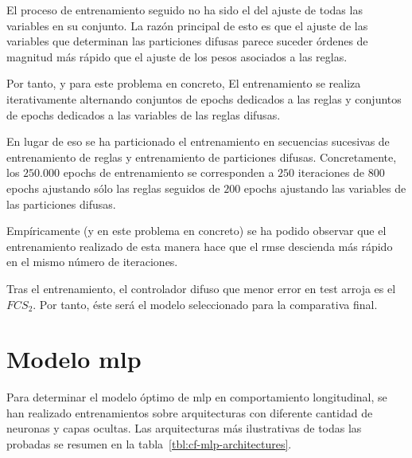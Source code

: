 El proceso de entrenamiento seguido no ha sido el del ajuste de todas las variables en su conjunto. La razón principal de esto es que el ajuste de las variables que determinan las particiones difusas parece suceder órdenes de magnitud más rápido que el ajuste de los pesos asociados a las reglas.

Por tanto, y para este problema en concreto, El entrenamiento se realiza iterativamente alternando conjuntos de epochs dedicados a las reglas y conjuntos de epochs dedicados a las variables de las reglas difusas.

En lugar de eso se ha particionado el entrenamiento en secuencias sucesivas de entrenamiento de reglas y entrenamiento de particiones difusas. Concretamente, los $250.000$ epochs de entrenamiento se corresponden a $250$ iteraciones de $800$ epochs ajustando sólo las reglas seguidos de $200$ epochs ajustando las variables de las particiones difusas.

Empíricamente (y en este problema en concreto) se ha podido observar que el entrenamiento realizado de esta manera hace que el \ac{rmse} descienda más rápido en el mismo número de iteraciones.

Tras el entrenamiento, el controlador difuso que menor error en test arroja es el $FCS_2$. Por tanto, éste será el modelo seleccionado para la comparativa final.


\section{Modelo \ac{mlp}}

Para determinar el modelo óptimo de \ac{mlp} en comportamiento longitudinal, se han realizado entrenamientos sobre arquitecturas con diferente cantidad de neuronas y capas ocultas. Las arquitecturas más ilustrativas de todas las probadas se resumen en la tabla~\ref{tbl:cf-mlp-architectures}.

